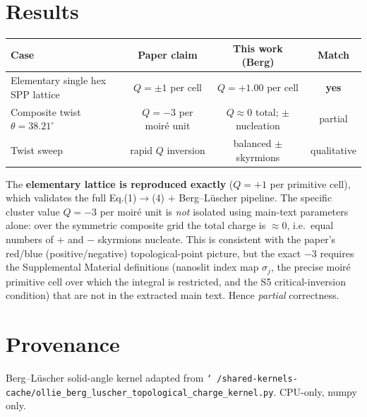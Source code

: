 \documentclass[11pt]{article}
\begin{document}
\section{Results}
\begin{center}
\begin{tabular}{lccc}
\hline
Case & Paper claim & This work (Berg) & Match \\ \hline
Elementary single hex SPP lattice & $Q=\pm1$ per cell & $Q=+1.00$ per cell & \textbf{yes} \\
Composite twist $\theta=38.21^\circ$ & $Q=-3$ per moir\'e unit & $Q\approx0$ total; $\pm$ nucleation & partial \\
Twist sweep & rapid $Q$ inversion & balanced $\pm$ skyrmions & qualitative \\ \hline
\end{tabular}
\end{center}

The \textbf{elementary lattice is reproduced exactly} ($Q=+1$ per primitive
cell), which validates the full Eq.(1)$\to$(4) $+$ Berg--L\"uscher pipeline. The
specific cluster value $Q=-3$ per moir\'e unit is \emph{not} isolated using
main-text parameters alone: over the symmetric composite grid the total charge
is $\approx0$, i.e.\ equal numbers of $+$ and $-$ skyrmions nucleate. This is
consistent with the paper's red/blue (positive/negative) topological-point
picture, but the exact $-3$ requires the Supplemental Material definitions
(nanoslit index map $\sigma_j$, the precise moir\'e primitive cell over which the
integral is restricted, and the S5 critical-inversion condition) that are not in
the extracted main text. Hence \emph{partial} correctness.

\section*{Provenance}
Berg--L\"uscher solid-angle kernel adapted from
\texttt{\char`~/shared-kernels-cache/ollie\_berg\_luscher\_topological\_charge\_kernel.py}.
CPU-only, numpy only.
\end{document}
